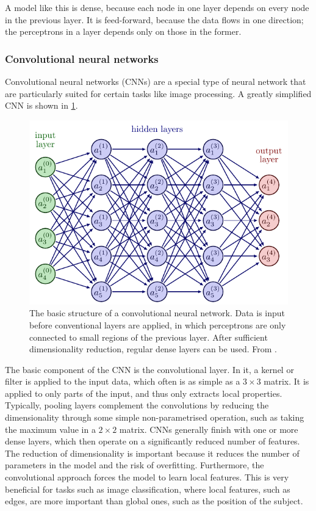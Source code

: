 A model like this is dense, because each node in one layer depends on every node in the previous layer.
It is feed-forward, because the data flows in one direction; the perceptrons in a layer depends only on those in the former.



\subsubsection{Convolutional neural networks}
Convolutional neural networks (CNNs) are a special type of neural network that are particularly suited for certain tasks like image processing.
A greatly simplified CNN is shown in \cref{fig:cnn}.

\begin{figure}
    \centering
    \includegraphics[width=0.75\linewidth, page=7]{neural_networks.pdf}
    \caption{
        The basic structure of a convolutional neural network.
        Data is input before conventional layers are applied, in which perceptrons are only connected to small regions of the previous layer.
        After sufficient dimensionality reduction, regular dense layers can be used.
        From \cite{nn_figs}.
    }
    \label{fig:cnn}
\end{figure}

The basic component of the CNN is the convolutional layer.
In it, a kernel or filter is applied to the input data, which often is as simple as a $3 \times 3$ matrix.
It is applied to only parts of the input, and thus only extracts local properties.
Typically, pooling layers complement the convolutions by reducing the dimensionality through some simple non-parametrised operation, such as taking the maximum value in a $2 \times 2$ matrix.
CNNs generally finish with one or more dense layers, which then operate on a significantly reduced number of features.
The reduction of dimensionality is important because it reduces the number of parameters in the model and the risk of overfitting.
Furthermore, the convolutional approach forces the model to learn local features.
This is very beneficial for tasks such as image classification, where local features, such as edges, are more important than global ones, such as the position of the subject.